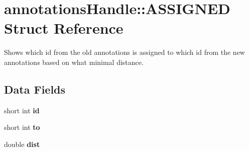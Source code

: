 \hypertarget{structannotationsHandle_1_1ASSIGNED}{
\section{annotationsHandle::ASSIGNED Struct Reference}
\label{structannotationsHandle_1_1ASSIGNED}
}


Shows which id from the old annotations is assigned to which id from the new annotations based on what minimal distance.  


\subsection*{Data Fields}
\begin{DoxyCompactItemize}
\item 
\hypertarget{structannotationsHandle_1_1ASSIGNED_a4ddebd766a76758ce4466a465aeed90b}{
short int {\bfseries id}}
\label{structannotationsHandle_1_1ASSIGNED_a4ddebd766a76758ce4466a465aeed90b}

\item 
\hypertarget{structannotationsHandle_1_1ASSIGNED_afe51e2b74eb7c0a72c5380591086003a}{
short int {\bfseries to}}
\label{structannotationsHandle_1_1ASSIGNED_afe51e2b74eb7c0a72c5380591086003a}

\item 
\hypertarget{structannotationsHandle_1_1ASSIGNED_accf93555161c9eedf006462a228af523}{
double {\bfseries dist}}
\label{structannotationsHandle_1_1ASSIGNED_accf93555161c9eedf006462a228af523}

\end{DoxyCompactItemize}
